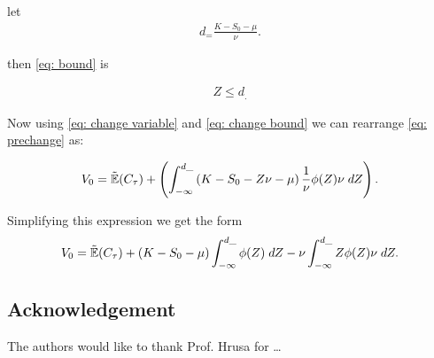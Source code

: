 \documentclass[reqno]{amsart}
\begin{document}
let
\begin{align}
     d_ = \frac{K-S_0-\mu}{\nu}.
\end{align}

then \eqref{eq: bound} is 

\begin{align} \label{eq: change bound}
     Z \leq d_.
\end{align}

Now using \eqref{eq: change variable} and \eqref{eq: change bound} we can rearrange \eqref{eq: prechange} as:

\begin{align}
     V_0 = \tilde{\mathbb{E}}(C_\tau) + \left(\int_{-\infty}^{d\_}\left(K- S_0 - Z\nu - \mu\right)\frac{1}{\nu}\phi(Z)\nu \; dZ\right).
\end{align}

Simplifying this expression we get the form
\begin{align}
     V_0 = \tilde{\mathbb{E}}(C_\tau) + (K- S_0 - \mu)\int_{-\infty}^{d\_}\phi(Z) \; dZ - \nu \int_{-\infty}^{d\_}Z\phi(Z)\nu \; dZ.
\end{align}


\subsection*{Acknowledgement} The authors would like to thank Prof. Hrusa for \dots 

\end{document}
